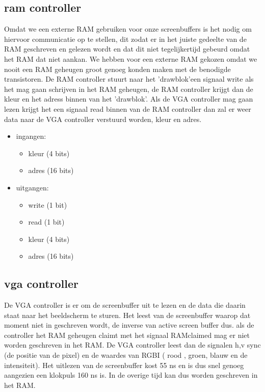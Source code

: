 \documentclass{scrartcl}
\begin{document}
\begin {itemize}
\subsection { ram controller}

Omdat we een externe RAM gebruiken voor onze screenbuffers is het nodig om hiervoor communicatie op te stellen, dit zodat er in het juiste gedeelte van de RAM geschreven en gelezen wordt en dat dit niet tegelijkertijd gebeurd omdat het RAM dat niet aankan. We hebben voor een externe RAM gekozen omdat we nooit een RAM geheugen groot genoeg konden maken met de benodigde transistoren. De RAM controller stuurt naar het 'drawblok'een signaal write als het mag gaan schrijven in het RAM geheugen, de RAM controller krijgt dan de kleur en het adress binnen van het 'drawblok'. Als de VGA controller mag gaan lezen krijgt het een signaal read binnen van de RAM controller dan zal er weer data naar de VGA controller verstuurd worden, kleur en adres.

\begin {itemize}
\item ingangen:
\begin {itemize}
\item kleur (4 bits)
\item adres (16 bits)
\end {itemize}
\item uitgangen:
\begin {itemize}
\item write (1 bit)
\item read (1 bit)
\item kleur (4 bits)
\item adres (16 bits)
\end {itemize}
\end {itemize}


\subsection { vga controller}

De VGA controller is er om de screenbuffer uit te lezen en de data die daarin staat naar het beeldscherm te sturen. Het leest van de screenbuffer waarop dat moment niet in geschreven wordt, de inverse van active screen buffer dus. als de controller het RAM geheugen claimt met het signaal RAMclaimed mag er niet worden geschreven in het RAM. De VGA controller leest dan de signalen h,v sync (de positie van de pixel) en de waardes van RGBI ( rood , groen, blauw en de intensiteit). Het uitlezen van de screenbuffer kost 55 ns en is dus snel genoeg aangezien een klokpuls 160 ns is. In de overige tijd kan dus worden geschreven in het RAM.


\end{itemize}
\end{document}
